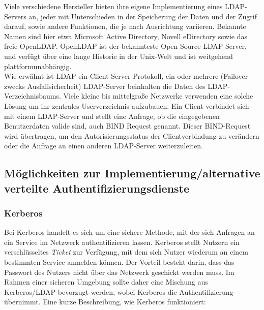 \documentclass[letterpaper, 12pt]{article}
\let\tempsubsection\subsection
\renewcommand\subsection[1]{\vspace{0cm}\tempsubsection{#1}\vspace{0cm}}
\let\tempsubsubsection\subsubsection
\renewcommand\subsubsection[1]{\vspace{0cm}\tempsubsubsection{#1}\vspace{0cm}}
\begin{document}
Viele verschiedene Hersteller bieten ihre eigene Implementierung eines LDAP-Servers
an, jeder mit Unterschieden in der Speicherung der Daten und der Zugrif darauf, sowie
andere Funktionen, die je nach Ausrichtung variieren. Bekannte Namen sind hier etwa Microsoft Active Directory, Novell eDirectory sowie das freie OpenLDAP. OpenLDAP ist der bekannteste Open Source-LDAP-Server, und verfügt über eine lange
Historie in der Unix-Welt und ist weitgehend plattformunabhängig. \\

Wie erwähnt ist LDAP ein Client-Server-Protokoll, ein oder mehrere (Failover zwecks
Ausfallsicherheit) LDAP-Server beinhalten die Daten des LDAP-Verzeichnisbaums. Viele
kleine bis mittelgroße Netzwerke verwenden eine solche Lösung um ihr zentrales
Userverzeichnis aufzubauen. Ein Client verbindet sich mit einem LDAP-Server und
stellt eine Anfrage, ob die eingegebenen Benutzerdaten valide sind, auch BIND Request
genannt. Dieser BIND-Request wird übertragen, um den Autorisierungsstatus
der Clientverbindung zu verändern oder die Anfrage an einen anderen LDAP-Server
weiterzuleiten. \cite{ce}

\subsection{Möglichkeiten zur Implementierung/alternative verteilte Authentifizierungsdienste}

\subsubsection{Kerberos}

Bei Kerberos handelt es sich um eine sichere Methode, mit der sich Anfragen an ein Service im Netzwerk authentifizieren lassen. Kerberos stellt Nutzern ein verschlüsseltes \textit{Ticket} zur Verfügung, mit dem sich Nutzer wiederum an einem bestimmten Service anmelden können. Der Vorteil besteht darin, dass das Passwort des Nutzers nicht über das Netzwerk geschickt werden muss. Im Rahmen einer sicheren Umgebung sollte daher eine Mischung aus Kerberos/LDAP bevorzugt werden, wobei Kerberos die Authentifizierung übernimmt. Eine kurze Beschreibung, wie Kerberos funktioniert: \cite{kerberos}
\end{document}
